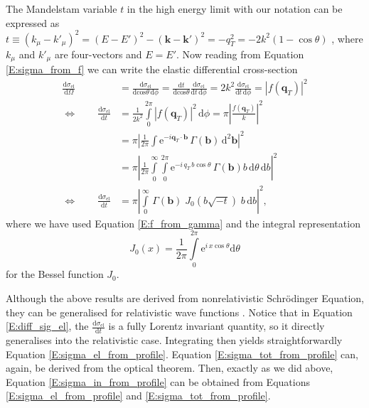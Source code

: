 \documentclass[a4paper, twoside, english, 12pt]{report}
\begin{document}
The Mandelstam variable $t$ in the high energy limit with our notation can be expressed as $t \equiv (k_\mu-k'_\mu)^2 = (E-E')^2-(\mathbf{k}-\mathbf{k'})^2 = -q_T^2 =  -2k^2(1-\cos\theta)$ \cite{hitu}, where $k_\mu$ and $k'_\mu$ are four-vectors and $E=E'$. Now reading from Equation \eqref{E:sigma_from_f} we can write the elastic differential cross-section
\begin{align}
	\frac{\text{d} \sigma_{\text{el}}}{\text{d}\Omega} &= \frac{\text{d} \sigma_{\text{el}}}{\text{d}\text{cos}\theta\,\text{d}\phi} = \frac{\text{d}t}{\text{d}\text{cos}\theta}\frac{\text{d} \sigma_{\text{el}}}{\text{d}t\,\text{d}\phi} = 2k^2\frac{\text{d} \sigma_{\text{el}}}{\text{d}t\,\text{d}\phi} = |f(\mathbf{q}_T)|^2 \nonumber \\[1em]
	\Leftrightarrow \qquad \frac{\text{d} \sigma_{\text{el}}}{\text{d}t} &= \frac{1}{2k^2}\int\limits_{0}^{2\pi} |f(\mathbf{q}_T)|^2 \,\text{d}\phi = \pi \left|\frac{f(\mathbf{q}_T)}{k}\right|^2 \nonumber \\[1em]
	&= \pi\left|\frac{1}{2\pi}\int \text{e}^{-i\mathbf{q}_T\cdot\mathbf{b}}\,\Gamma(\mathbf{b})\,\text{d}^2\mathbf{b}\right|^2 \nonumber \\[1em]
	&= \pi\left|\frac{1}{2\pi}\int\limits_{0}^{\infty}\int\limits_{0}^{2\pi} \text{e}^{-i\,q_T\,b\cos\theta}\,\Gamma(\mathbf{b})b\,\text{d}\theta\,\text{d}b\right|^2\nonumber \\[1em]
	\Leftrightarrow \qquad \frac{\text{d} \sigma_{\text{el}}}{\text{d}t}&= \pi\left|\int\limits_{0}^{\infty} \,\Gamma(\mathbf{b})\;J_0(b\sqrt{-t})\;b\,\text{d}b\right|^2,\label{E:diff_sig_el}
\end{align}
where we have used Equation \eqref{E:f_from_gamma} and the integral representation \cite[Eq. 2.133]{barpred}
\begin{equation}
	J_0(x) = \frac{1}{2\pi}\int\limits_{0}^{2\pi} \text{e}^{i\,x\cos\theta}\text{d}\theta
\end{equation}
for the Bessel function $J_0$.

Although the above results are derived from nonrelativistic Schrödinger Equation, they can be generalised for relativistic wave functions \cite{barpred}. Notice that in Equation \eqref{E:diff_sig_el}, the $\frac{\text{d} \sigma_{\text{el}}}{\text{d}t}$ is a fully Lorentz invariant quantity, so it directly generalises into the relativistic case. Integrating then yields straightforwardly Equation \eqref{E:sigma_el_from_profile}. Equation \eqref{E:sigma_tot_from_profile} can, again, be derived from the optical theorem. Then, exactly as we did above, Equation \eqref{E:sigma_in_from_profile} can be obtained from Equations \eqref{E:sigma_el_from_profile} and \eqref{E:sigma_tot_from_profile}.
\end{document}
